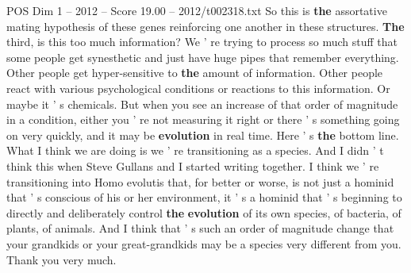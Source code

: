 \begin{textsample}{POS Dim 1 – 2012 – Score 19.00 – 2012/t002318.txt}
So this is \textbf{the} assortative mating hypothesis of these genes reinforcing one another in these structures. \textbf{The} third, is this too much information?
We ' re trying to process so much stuff that some people get synesthetic and just have huge pipes that remember everything.
Other people get hyper-sensitive to \textbf{the} amount of information.
Other people react with various psychological conditions or reactions to this information.
Or maybe it ' s chemicals.
But when you see an increase of that order of magnitude in a condition, either you ' re not measuring it right or there ' s something going on very quickly, and it may be \textbf{evolution} in real time.
Here ' s \textbf{the} bottom line.
What I think we are doing is we ' re transitioning as a species.
And I didn ' t think this when Steve Gullans and I started writing together.
I think we ' re transitioning into Homo evolutis that, for better or worse, is not just a hominid that ' s conscious of his or her environment, it ' s a hominid that ' s beginning to directly and deliberately control \textbf{the} \textbf{evolution} of its own species, of bacteria, of plants, of animals.
And I think that ' s such an order of magnitude change that your grandkids or your great-grandkids may be a species very different from you.
Thank you very much.

\end{textsample}
